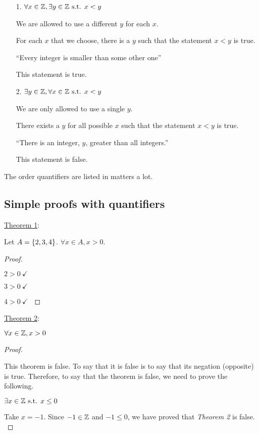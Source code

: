\begin{enumerate}
  \item[1.] \(\forall x \in \mathbb{Z}, \exists y \in \mathbb{Z} \text{ s.t. } x < y\)

        We are allowed to use a different \(y\) for each \(x\).

        For each \(x\) that we choose, there is a \(y\) such that the statement \(x < y\) is true.

        ``Every integer is smaller than some other one''

        This statement is true.

  \item[2.] \(\exists y \in \mathbb{Z}, \forall x \in \mathbb{Z} \text{ s.t. } x < y\)

        We are only allowed to use a single \(y\).

        There exists a \(y\) for all possible \(x\) such that the statement \(x < y\) is true.

        ``There is an integer, \(y\), greater than all integers.''

        This statement is false.
\end{enumerate}

The order quantifiers are listed in matters a lot.

\subsection{Simple proofs with quantifiers}

\underline{Theorem 1}:

Let \(A = \left\{2, 3, 4\right\}\). \(\forall x \in A, x > 0\).

\begin{proof} \(\)

  \(2 > 0~\checkmark\)

  \(3 > 0~\checkmark\)

  \(4 > 0~\checkmark\) \(\qedhere\)
\end{proof}

\underline{Theorem 2}:

\(\forall x \in \mathbb{Z}, x > 0\)

\begin{proof} \(\)

  This theorem is false. To say that it is false is to say that its negation (opposite) is true. Therefore, to say that the theorem is false, we need to prove the following.

  \(\exists x \in \mathbb{Z} \text{ s.t. } x \leq 0\)

  Take \(x = -1\). Since \(-1 \in \mathbb{Z}\) and \(-1 \leq 0\), we have proved that \emph{Theorem 2} is false. \(\qedhere\)
\end{proof}

